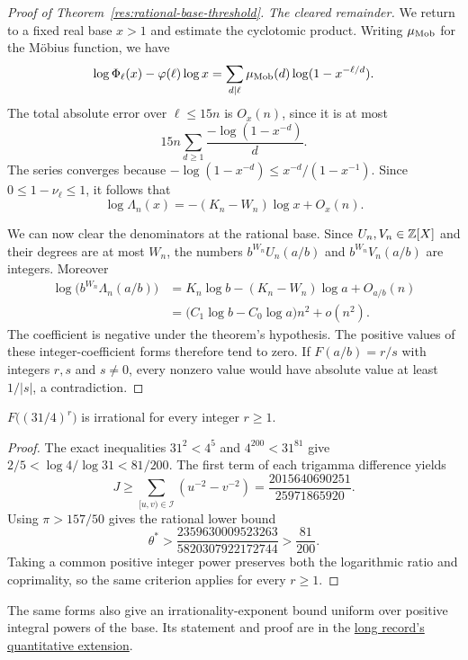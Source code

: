 \documentclass[11pt]{article}
\newcommand{\shortrecordlink}[3]{\href{#1\##2}{#3}}
\begin{document}
\begin{proof}[Proof of Theorem~\ref{res:rational-base-threshold}]
\emph{The cleared remainder.}
We return to a fixed real base $x>1$ and estimate the cyclotomic
product. Writing $\mu_{\rm Mob}$ for the M\"obius function, we have
\[
 \log\Phi_\ell(x)-\varphi(\ell)\log x
 =\sum_{d\mid\ell}\mu_{\rm Mob}(d)\log(1-x^{-\ell/d}).
\]
The total absolute error over $\ell\le15n$ is $O_x(n)$, since it is at most
\[
 15n\sum_{d\ge1}\frac{-\log(1-x^{-d})}{d}.
\]
The series converges because
$-\log(1-x^{-d})\le x^{-d}/(1-x^{-1})$.
Since $0\le1-\nu_\ell\le1$, it follows that
\[
 \log\Lambda_n(x)=-(K_n-W_n)\log x+O_x(n).
\]

We can now clear the denominators at the rational base.
Since $U_n,V_n\in\mathbb{Z}[X]$ and their degrees are at most $W_n$,
the numbers $b^{W_n}U_n(a/b)$ and $b^{W_n}V_n(a/b)$ are integers.
Moreover
\[
\begin{split}
 \log\bigl(b^{W_n}\Lambda_n(a/b)\bigr)
 &=K_n\log b-(K_n-W_n)\log a+O_{a/b}(n)\\
 &=\bigl(C_1\log b-C_0\log a\bigr)n^2+o(n^2).
\end{split}
\]
The coefficient is negative under the theorem's hypothesis. The positive
values of these integer-coefficient forms therefore tend to zero.
If $F(a/b)=r/s$ with integers $r,s$ and $s\ne0$, every nonzero value
would have absolute value at least $1/|s|$, a contradiction.
\end{proof}

\begin{corollary}\label{res:thirtyone-four}
$F\bigl((31/4)^r\bigr)$ is irrational for every integer $r\ge1$.
\end{corollary}
\begin{proof}
The exact inequalities $31^2<4^5$ and $4^{200}<31^{81}$ give
$2/5<\log4/\log31<81/200$.
The first term of each trigamma difference yields
\[
 J\ge\sum_{[u,v)\in\mathcal I}(u^{-2}-v^{-2})
   =\frac{2015640690251}{25971865920}.
\]
Using $\pi>157/50$ gives the rational lower bound
\[
 \theta^*>\frac{2359630009523263}{5820307922172744}
           >\frac{81}{200}.
\]
Taking a common positive integer power preserves both the logarithmic
ratio and coprimality, so the same criterion applies for every $r\ge1$.
\end{proof}

The same forms also give an irrationality-exponent bound uniform over
positive integral powers of the base. Its statement and proof are in the
\shortrecordlink{erdos1049-rational-base-lambert-reasoning-surface.pdf}
{scope-measure}{long record's quantitative extension}.
\end{document}

